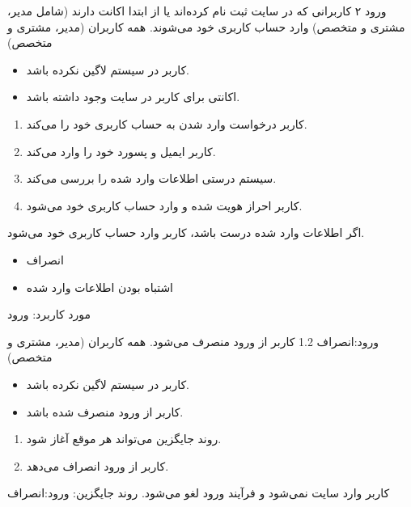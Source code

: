 {
\usecase
{ورود}
{۲}
{کاربرانی که در سایت ثبت‌ نام کرده‌اند یا از ابتدا اکانت دارند (شامل مدیر، مشتری و متخصص) وارد حساب کاربری خود می‌شوند.}
{همه کاربران (مدیر، مشتری و متخصص)}
{}
{
		\begin{itemize}
		\item
		کاربر در سیستم لاگین نکرده باشد.
		\item
		اکانتی برای کاربر در سایت وجود داشته باشد.
	\end{itemize}
	
}
{
\begin{enumerate}
	\item 
	کاربر درخواست وارد شدن به حساب کاربری خود را می‌کند.
	
	
	\item 
	کاربر ایمیل و پسورد خود را وارد می‌کند.
	
	\item
	سیستم درستی اطلاعات وارد شده را بررسی می‌کند.
	
	\item
	کاربر احراز هویت شده و وارد حساب کاربری خود می‌شود.
\end{enumerate}
}
{اگر اطلاعات وارد شده درست باشد، کاربر وارد حساب کاربری خود می‌شود.}
{	
	
	\begin{itemize}
	\item
	 انصراف
	
	\item
	اشتباه بودن اطلاعات وارد شده
	\end{itemize}
}
{مورد کاربرد: ورود }

\alternativeflow
{
	ورود:انصراف
}
{1.2}
{
	کاربر از ورود منصرف می‌شود.
}
{
	همه کاربران (مدیر، مشتری و متخصص)
}
{}
{
	\begin{itemize}
		\vspace*{-0.6cm}
		\item 
		کاربر در سیستم لاگین نکرده باشد.
		\item
		کاربر از ورود  منصرف شده باشد.
	\end{itemize}
}
{
	\vspace*{-0.6cm}
	\begin{enumerate}
		\item 
		روند جایگزین می‌تواند هر موقع آغاز شود.
		\item
		کاربر از ورود  انصراف می‌دهد.
	\end{enumerate}
}
{
	کاربر وارد سایت نمی‌شود و فرآیند ورود لغو می‌شود.
}
{
	روند جایگزین: ورود:انصراف
}

}
